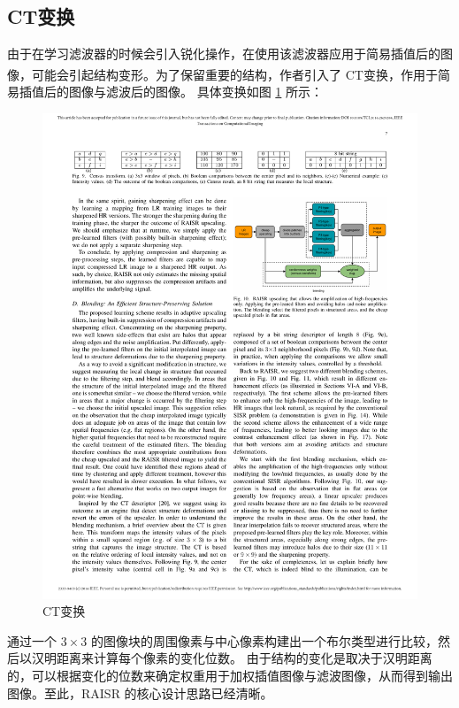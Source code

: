 \documentclass[12pt, a4paper, oneside]{ctexbook}
\begin{document}
	\subsection{CT变换}
	由于在学习滤波器的时候会引入锐化操作，在使用该滤波器应用于简易插值后的图像，可能会引起结构变形。为了保留重要的结构，作者引入了 CT变换\textsuperscript{\cite{7}}，作用于简易插值后的图像与滤波后的图像。
	具体变换如图 \ref{CT_tran} 所示：
		\begin{figure}[h]
		\centering
		\includegraphics[scale=0.88]{./pic/CT.pdf}
		\caption{CT变换}
		\label{CT_tran}
		\end{figure}
	通过一个 $3\times 3$ 的图像块的周围像素与中心像素构建出一个布尔类型进行比较，然后以汉明距离来计算每个像素的变化位数。
	由于结构的变化是取决于汉明距离的，可以根据变化的位数来确定权重用于加权插值图像与滤波图像，从而得到输出图像。至此，RAISR 的核心设计思路已经清晰。
	
\end{document}

